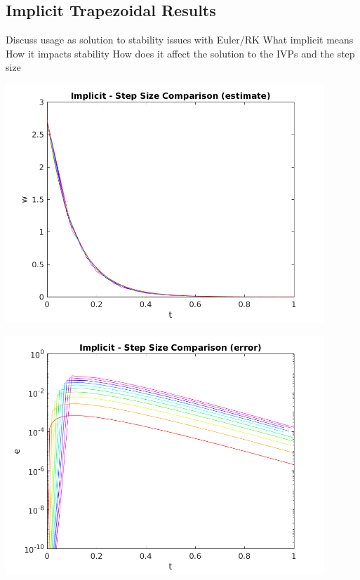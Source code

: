 \documentclass{article}
\begin{document}
\subsection{Implicit Trapezoidal Results}
\label{results:implicit}

Discuss usage as solution to stability issues with Euler/RK
What implicit means
How it impacts stability
How does it affect the solution to the IVPs and the step size

\begin{center}
  \includegraphics[width=0.9\textwidth]{../output/a_implicit_h_val.png}
  \label{fig:a_implicit_h_val}
\end{center}

\begin{center}
  \includegraphics[width=0.9\textwidth]{../output/a_implicit_h_err.png}
  \label{fig:a_implicit_h_err}
\end{center}
\end{document}
